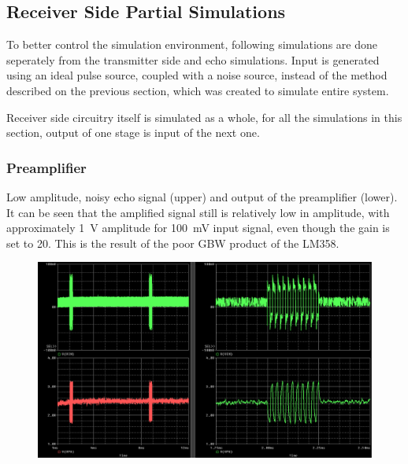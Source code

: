 \documentclass[12pt, a4paper]{article}
\begin{document}
        \pagebreak
        \subsection{Receiver Side Partial Simulations}
                
                To better control the simulation environment, following simulations are done seperately from the transmitter side and echo simulations. Input is generated using an ideal pulse source, coupled with a noise source, instead of the method described on the previous section, which was created to simulate entire system.

                Receiver side circuitry itself is simulated as a whole, for all the simulations in this section, output of one stage is input of the next one.

                \bigskip\bigskip

            \subsubsection{Preamplifier}

                \noindent Low amplitude, noisy echo signal (upper) and output of the preamplifier (lower). It can be seen that the amplified signal still is relatively low in amplitude, with approximately \SI{1}{\volt} amplitude for \SI{100}{\milli\volt} input signal, even though the gain is set to 20. This is the result of the poor GBW product of the LM358.
                \begin{figure}[H]\centering
                    \includegraphics[width = \textwidth]{simulations/receive/preamp.png}
                    \caption[]{}
                \end{figure}
\end{document}
